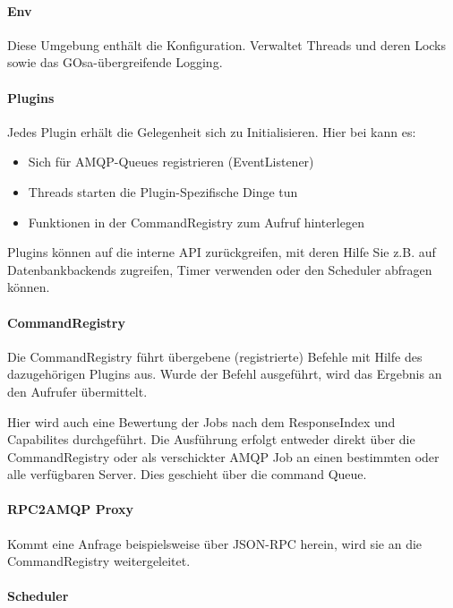 \paragraph{Env}

Diese Umgebung enthält die Konfiguration. Verwaltet Threads und deren Locks sowie
das GOsa-übergreifende Logging.


\paragraph{Plugins}

Jedes Plugin erhält die Gelegenheit sich zu Initialisieren. Hier bei kann es:

\begin{itemize}
\item Sich für AMQP-Queues registrieren (EventListener)
\item Threads starten die Plugin-Spezifische Dinge tun
\item Funktionen in der CommandRegistry zum Aufruf hinterlegen
\end{itemize}

Plugins können auf die interne API zurückgreifen, mit deren Hilfe Sie z.B.
auf Datenbankbackends zugreifen, Timer verwenden oder den Scheduler abfragen können.


\paragraph{CommandRegistry}

Die CommandRegistry führt übergebene (registrierte) Befehle mit Hilfe
des dazugehörigen Plugins aus. Wurde der Befehl ausgeführt, wird das
Ergebnis an den Aufrufer übermittelt.

Hier wird auch eine Bewertung der Jobs nach dem ResponseIndex und Capabilites durchgeführt.
Die Ausführung erfolgt entweder direkt über die CommandRegistry oder als verschickter
AMQP Job an einen bestimmten oder alle verfügbaren Server. Dies geschieht über die command Queue.


\paragraph{RPC2AMQP Proxy}

Kommt eine Anfrage beispielsweise über JSON-RPC herein, wird sie an die CommandRegistry
weitergeleitet.


\paragraph{Scheduler}

